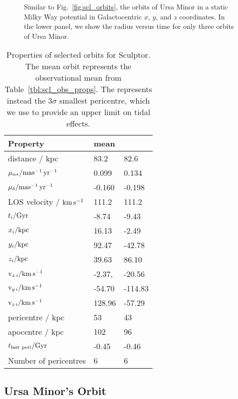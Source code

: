 \begin{figure}
\centering
{}
\caption[Ursa Minor Orbits]{Similar to Fig.~\ref{fig:scl_orbits}, the
orbits of Ursa Minor in a static Milky Way potential in Galactocentric
\(x\), \(y\), and \(z\) coordinates. In the lower panel, we show the
radius versus time for only three orbits of Ursa
Minor.}\label{fig:umi_orbits}
\end{figure}

\begin{table*}[t]
\centering
\caption[Sculptor Selected Orbits]{Properties of selected orbits for Sculptor. The mean orbit represents the observational mean from Table \ref{tbl:scl_obs_props}. The \smallperi{} represents instead the $3\sigma$ smallest pericentre, which we use to provide an upper limit on tidal effects. }
\label{tbl:scl_orbits}
\begin{tabular}{lll}
\toprule
Property & mean & \smallperi{}\\
\midrule
distance / kpc & 83.2 & 82.6\\
$\mu_{\alpha*} / {\rm mas^{-1}\,yr^{-1}}$ & 0.099 & 0.134\\
$\mu_{\delta} / {\rm mas^{-1}\,yr^{-1}}$ & -0.160 & -0.198\\
LOS velocity / ${\rm km\,s^{-1}}$ & 111.2 & 111.2\\
$t_i / {\rm Gyr}$ & -8.74 & -9.43\\
${x}_{i} / {\rm kpc}$ & 16.13 & -2.49\\
${y}_{i} / {\rm kpc}$ & 92.47 & -42.78\\
${z}_{i} / {\rm kpc}$ & 39.63 & 86.10\\
${\rm v}_{x\,i} / {\rm km\,s^{-1}}$ & -2.37, & -20.56\\
${\rm v}_{y\,i} / {\rm km\,s^{-1}}$ & -54.70 & -114.83\\
${\rm v}_{z\,i} / {\rm km\,s^{-1}}$ & 128.96 & -57.29\\
pericentre / kpc & 53 & 43\\
apocentre / kpc & 102 & 96\\
$t_{\rm last\ peri} / {\rm Gyr}$ & -0.45 & -0.46\\
Number of pericentres & 6 & 6\\
\bottomrule
\end{tabular}
\end{table*}

\subsection{Ursa Minor's Orbit}\label{ursa-minors-orbit}

